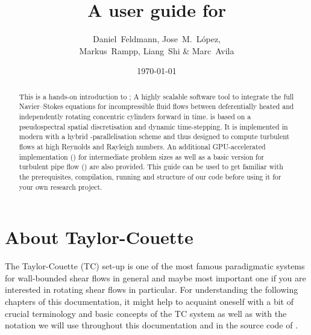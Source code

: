 \documentclass[a4paper, 11pt, DIV=11]{scrartcl}
\title{A user guide for \nsc}
\author{Daniel~Feldmann, Jose~M.~L\'opez,\\
Markus~Rampp, Liang~Shi \& Marc~Avila}
\date{\today}
\begin{document}
\maketitle

\begin{abstract}
This is a hands-on introduction to \nsc; A highly scalable software tool
to integrate the full Navier--Stokes equations for incompressible fluid
flows between deferentially heated and independently rotating concentric
cylinders forward in time. \nsc is based on a pseudospectral spatial
discretisation and dynamic time-stepping. It is implemented in modern
\fortran with a hybrid \mpi-\omp parallelisation scheme and thus designed
to compute turbulent flows at high Reynolds and Rayleigh numbers. An
additional GPU-accelerated implementation (\cuda) for intermediate problem
sizes as well as a basic version for turbulent pipe flow (\nsp) are also
provided. This guide can be used to get familiar with the prerequisites,
compilation, running and structure of our code before using it for your
own research project.
\end{abstract}
\tableofcontents

\section{About Taylor-Couette}
\label{sec:taylorCouette}
The Taylor-Couette (TC) set-up is one of the most famous paradigmatic systems
for wall-bounded shear flows in general and maybe  most important
one if you are interested in rotating shear flows in particular. For
understanding the following chapters of this documentation, it might help
to acquaint oneself with a bit of crucial terminology and basic
concepts of the TC system as well as with the notation we will use throughout
this documentation and in the source code of \nsc.
\end{document}
